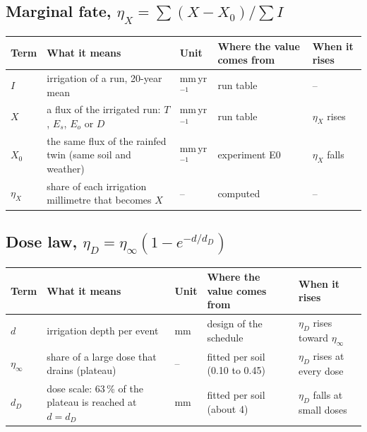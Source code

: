 \subsection*{Marginal fate, $\eta_X=\sum(X-X_0)/\sum I$}
{\small\begin{longtable}{>{\raggedright\arraybackslash}p{}>{\raggedright\arraybackslash}p{}>{\raggedright\arraybackslash}p{}>{\raggedright\arraybackslash}p{}>{\raggedright\arraybackslash}p{}}\toprule Term & What it means & Unit & Where the value comes from & When it rises\\\midrule\endhead
$I$ & irrigation of a run, 20-year mean & mm\,yr$^{-1}$ & run table & --\\
$X$ & a flux of the irrigated run: $T$, $E_s$, $E_o$ or $D$ & mm\,yr$^{-1}$ & run table & $\eta_X$ rises\\
$X_0$ & the same flux of the rainfed twin (same soil and weather) & mm\,yr$^{-1}$ & experiment E0 & $\eta_X$ falls\\
$\eta_X$ & share of each irrigation millimetre that becomes $X$ & -- & computed & --\\
\bottomrule\end{longtable}}
\subsection*{Dose law, $\eta_D=\eta_\infty(1-e^{-d/d_D})$}
{\small\begin{longtable}{>{\raggedright\arraybackslash}p{}>{\raggedright\arraybackslash}p{}>{\raggedright\arraybackslash}p{}>{\raggedright\arraybackslash}p{}>{\raggedright\arraybackslash}p{}}\toprule Term & What it means & Unit & Where the value comes from & When it rises\\\midrule\endhead
$d$ & irrigation depth per event & mm & design of the schedule & $\eta_D$ rises toward $\eta_\infty$\\
$\eta_\infty$ & share of a large dose that drains (plateau) & -- & fitted per soil (0.10 to 0.45) & $\eta_D$ rises at every dose\\
$d_D$ & dose scale: 63\,\% of the plateau is reached at $d=d_D$ & mm & fitted per soil (about 4) & $\eta_D$ falls at small doses\\
\bottomrule\end{longtable}}

